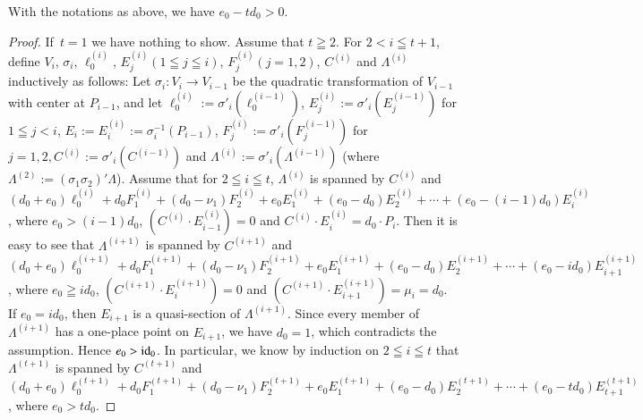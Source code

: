 \begin{lemma*}
With the notations as above, we have $e_{0}-td_{0}>0$. 
\end{lemma*}

\begin{proof}
If\pageoriginale\ $t=1$ we have nothing to show. Assume that $t\geqq
2$. For $2<i\leqq t+1$, define $V_{i}$, $\sigma_{i}$,
$\ell^{(i)}_{0}$, $E^{(i)}_{j}(1\leqq j\leqq i)$,
$F^{(i)}_{j}(j=1,2)$, $C^{(i)}$ and $\Lambda^{(i)}$ inductively as
follows: Let $\sigma_{i}:V_{i}\to V_{i-1}$ be the quadratic
transformation of $V_{i-1}$ with center at $P_{i-1}$, and let
$\ell^{(i)}_{0}:=\sigma'_{i}(\ell_{0}^{(i-1)})$,
$E^{(i)}_{j}:=\sigma'_{i}(E_{j}^{(i-1)})$ for $1\leqq j<i$,
$E_{i}:=E^{(i)}_{i}:=\sigma^{-1}_{i}(P_{i-1})$,
$F^{(i)}_{j}:=\sigma'_{i}(F^{(i-1)}_{j})$ for
$j=1,2,C^{(i)}:=\sigma'_{i}(C^{(i-1)})$ and
$\Lambda^{(i)}:=\sigma'_{i}(\Lambda^{(i-1)})$ (where
$\Lambda^{(2)}:=(\sigma_{1}\sigma_{2})'\Lambda$). Assume that for
$2\leqq i\leqq t$, $\Lambda^{(i)}$ is spanned by $C^{(i)}$ and
$(d_{0}+e_{0})\ell^{(i)}_{0}+d_{0}F^{(i)}_{1}+(d_{0}-\nu_{1})F^{(i)}_{2}+e_{0}E^{(i)}_{1}+(e_{0}-d_{0})E^{(i)}_{2}+\cdots+(e_{0}-(i-1)d_{0})E^{(i)}_{i}$,
where $e_{0}>(i-1)d_{0}$, $(C^{(i)}\cdot E^{(i)}_{i-1})=0$ and
$C^{(i)}\cdot E^{(i)}_{i}=d_{0}\cdot P_{i}$. Then it is easy to see
that $\Lambda^{(i+1)}$ is spanned by $C^{(i+1)}$ and
$(d_{0}+e_{0})\ell_{0}^{(i+1)}+d_{0}F_{1}^{(i+1)}+(d_{0}-\nu_{1})F_{2}^{(i+1)}+e_{0}E_{1}^{(i+1)}+(e_{0}-d_{0})E_{2}^{(i+1)}+\cdots+(e_{0}-id_{0})E^{(i+1)}_{i+1}$,
where $e_{0}\geqq id_{0}$, $(C^{(i+1)}\cdot E^{(i+1)}_{i})=0$ and
$(C^{(i+1)}\cdot E^{(i+1)}_{i+1})=\mu_{i}=d_{0}$. If $e_{0}=id_{0}$,
then $E_{i+1}$ is a quasi-section of $\Lambda^{(i+1)}$. Since every
member of $\Lambda^{(i+1)}$ has a one-place point on $E_{i+1}$, we
have $d_{0}=1$, which contradicts the assumption. Hence
$e_{0}>\operatorname{id}_{0}$. In particular, we know by induction on $2\leqq i\leqq
t$ that $\Lambda^{(t+1)}$ is spanned by $C^{(t+1)}$ and
$(d_{0}+e_{0})\ell^{(t+1)}_{0}+d_{0}F_{1}^{(t+1)}+(d_{0}-\nu_{1})F_{2}^{(t+1)}+e_{0}E_{1}^{(t+1)}+(e_{0}-d_{0})E^{(t+1)}_{2}+\cdots+(e_{0}-td_{0})E^{(t+1)}_{t+1}$,
where $e_{0}>td_{0}$. 
\end{proof}

